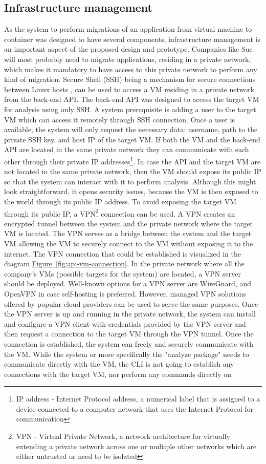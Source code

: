\documentclass[twocolumn]{article}
\newcommand{\FigRef}[1]{\hyperref[#1]{Figure~\ref{#1}}}
\begin{document}
\subsection{Infrastructure management}
As the system to perform migrations of an application from virtual machine to container was designed to have several components, infrastructure management is an important aspect of the proposed design and prototype. Companies like Sue will most probably need to migrate applications, residing in a private network, which makes it mandatory to have access to this private network to perform any kind of migration. Secure Shell (SSH) being a mechanism for secure connections between Linux hosts \cite{Both-2023}, can be used to access a VM residing in a private network from the back-end API. The back-end API was designed to access the target VM for analysis using only SSH. A system prerequisite is adding a user to the target VM which can access it remotely through SSH connection. Once a user is available, the system will only request the necessary data: username, path to the private SSH key, and host IP of the target VM. If both the VM and the back-end API are located in the same private network they can communicate with each other through their private IP addresses\footnote{IP address - Internet Protocol address, a numerical label that is assigned to a device connected to a computer network that uses the Internet Protocol for communication}. In case the API and the target VM are not located in the same private network, then the VM should expose its public IP so that the system can interact with it to perform analysis. Although this might look straightforward, it opens security issues, because the VM is then exposed to the world through its public IP address. To avoid exposing the target VM through its public IP, a VPN\footnote{VPN - Virtual Private Network, a network architecture for virtually extending a private network across one or multiple other networks which are either untrusted or need to be isolated} connection can be used. A VPN creates an encrypted tunnel between the system and the private network where the target VM is located. The VPN serves as a bridge between the system and the target VM allowing the VM to securely connect to the VM without exposing it to the internet. The VPN connection that could be established is visualized in the diagram \FigRef{fig:api-vm-connection}. In the private network where all the company's VMs (possible targets for the system) are located, a VPN server should be deployed. Well-known options for a VPN server are WireGuard, and OpenVPN in case self-hosting is preferred. However, managed VPN solutions offered by popular cloud providers can be used to serve the same purposes. Once the VPN server is up and running in the private network, the system can install and configure a VPN client with credentials provided by the VPN server and then request a connection to the target VM through the VPN tunnel. Once the connection is established, the system can freely and securely communicate with the VM. While the system or more specifically the "analyze package" needs to communicate directly with the VM, the CLI is not going to establish any connections with the target VM, nor perform any commands directly on 
\end{document}
